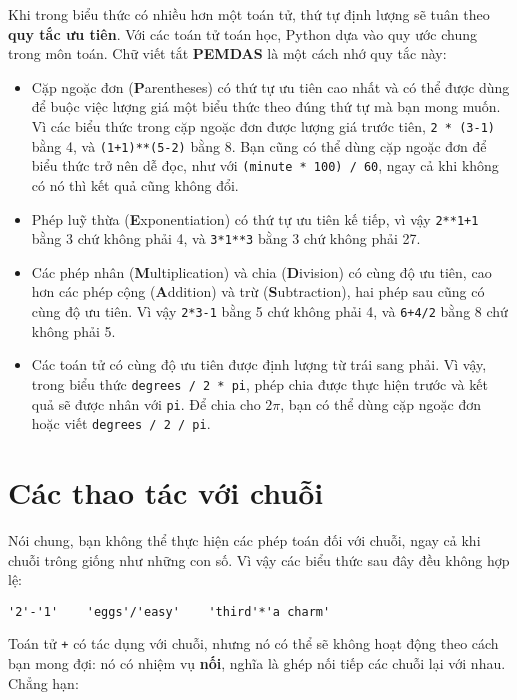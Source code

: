 \documentclass[11pt]{book}
\begin{document}
Khi trong biểu thức có nhiều hơn một toán tử, thứ tự định lượng
sẽ tuân theo {\bf quy tắc ưu tiên}. Với các toán tử toán học,
Python dựa vào quy ước chung trong môn toán. Chữ viết tắt
{\bf PEMDAS} là một cách nhớ quy tắc này:


\begin{itemize}

\item Cặp ngoặc đơn ({\bf P}arentheses) có thứ tự ưu tiên cao nhất
và có thể được dùng để buộc việc lượng giá một biểu thức theo đúng
thứ tự mà bạn mong muốn. Vì các biểu thức trong cặp ngoặc đơn được
lượng giá trước tiên, {\tt 2 * (3-1)} bằng 4,
và {\tt (1+1)**(5-2)} bằng 8. Bạn cũng có thể dùng cặp ngoặc đơn
để biểu thức trở nên dễ đọc, như với {\tt (minute * 100) / 60}, ngay
cả khi không có nó thì kết quả cũng không đổi.

\item Phép luỹ thừa ({\bf E}xponentiation) có thứ tự ưu tiên kế tiếp,
vì vậy {\tt 2**1+1} bằng 3 chứ không phải 4, và {\tt 3*1**3} bằng 3
chứ không phải 27.

\item Các phép nhân ({\bf M}ultiplication) và chia ({\bf D}ivision)
có cùng độ ưu tiên, cao hơn các phép cộng ({\bf A}ddition) và trừ ({\bf S}ubtraction), hai phép sau cũng có cùng độ ưu tiên. Vì vậy {\tt 2*3-1} bằng 5
chứ không phải 4, và {\tt 6+4/2} bằng 8 chứ không phải 5.

\item Các toán tử có cùng độ ưu tiên được định lượng từ trái sang phải.
Vì vậy, trong biểu thức {\tt degrees / 2 * pi}, phép chia được thực hiện
trước và kết quả sẽ được nhân với {\tt pi}. Để chia cho $2 \pi$, bạn có thể
dùng cặp ngoặc đơn hoặc viết {\tt degrees / 2 / pi}.

\end{itemize}


\section{Các thao tác với chuỗi}

Nói chung, bạn không thể thực hiện các phép toán đối với chuỗi, ngay cả
khi chuỗi trông giống như những con số. Vì vậy các biểu thức sau đây
đều không hợp lệ:

\beforeverb
\begin{verbatim}
'2'-'1'    'eggs'/'easy'    'third'*'a charm'
\end{verbatim}
\afterverb
%
Toán tử {\tt +} có tác dụng với chuỗi, nhưng nó có thể
sẽ không hoạt động theo cách bạn mong đợi: nó có nhiệm vụ
{\bf nối}, nghĩa là ghép nối tiếp các chuỗi lại với nhau.
Chẳng hạn:
\end{document}
